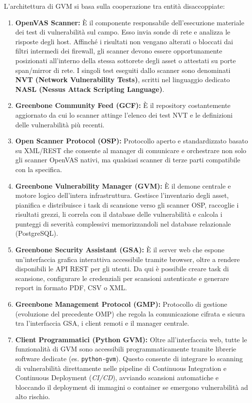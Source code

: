 \documentclass[../../main.tex]{subfiles}
\begin{document}
L'architettura di GVM si basa sulla cooperazione tra entità disaccoppiate:
\begin{enumerate}
    \item \textbf{OpenVAS Scanner:} È il componente responsabile dell'esecuzione materiale dei test di vulnerabilità sul campo. Esso invia sonde di rete e analizza le risposte degli host. Affinché i risultati non vengano alterati o bloccati dai filtri intermedi dei firewall, gli scanner devono essere opportunamente posizionati all'interno della stessa sottorete degli asset o attestati su porte span/mirror di rete. I singoli test eseguiti dallo scanner sono denominati \textbf{NVT (Network Vulnerability Tests)}, scritti nel linguaggio dedicato \textbf{NASL (Nessus Attack Scripting Language)}.
    \item \textbf{Greenbone Community Feed (GCF):} È il repository costantemente aggiornato da cui lo scanner attinge l'elenco dei test NVT e le definizioni delle vulnerabilità più recenti.
    \item \textbf{Open Scanner Protocol (OSP):} Protocollo aperto e standardizzato basato su XML/REST che consente al manager di comunicare e orchestrare non solo gli scanner OpenVAS nativi, ma qualsiasi scanner di terze parti compatibile con la specifica.
    \item \textbf{Greenbone Vulnerability Manager (GVM):} È il demone centrale e motore logico dell'intera infrastruttura. Gestisce l'inventario degli asset, pianifica e distribuisce i task di scansione verso gli scanner OSP, raccoglie i risultati grezzi, li correla con il database delle vulnerabilità e calcola i punteggi di severità complessivi memorizzandoli nel database relazionale (PostgreSQL).
    \item \textbf{Greenbone Security Assistant (GSA):} È il server web che espone un'interfaccia grafica interattiva accessibile tramite browser, oltre a rendere disponibili le API REST per gli utenti. Da qui è possibile creare task di scansione, configurare le credenziali per scansioni autenticate e generare report in formato PDF, CSV o XML.
    \item \textbf{Greenbone Management Protocol (GMP):} Protocollo di gestione (evoluzione del precedente OMP) che regola la comunicazione cifrata e sicura tra l'interfaccia GSA, i client remoti e il manager centrale.
    \item \textbf{Client Programmatici (Python GVM):} Oltre all'interfaccia web, tutte le funzionalità di GVM sono accessibili programmaticamente tramite librerie software dedicate (es. \texttt{python-gvm}). Questo consente di integrare lo scanning di vulnerabilità direttamente nelle pipeline di Continuous Integration e Continuous Deployment (\textit{CI/CD}), avviando scansioni automatiche e bloccando il deployment di immagini o container se emergono vulnerabilità ad alto rischio.
\end{enumerate}
\end{document}
